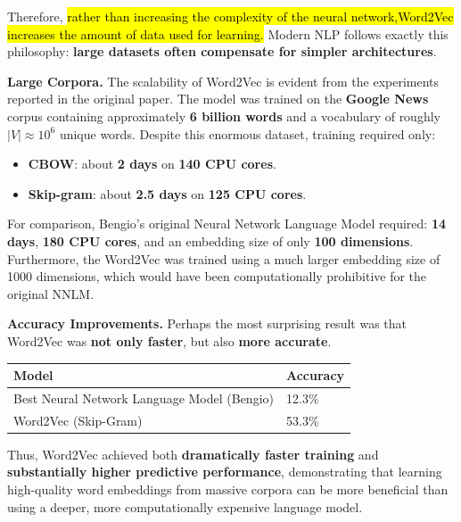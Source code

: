 \highspace
Therefore, \hl{rather than increasing the complexity of the neural network,\break Word2Vec increases the amount of data used for learning.} Modern NLP follows exactly this philosophy: \textbf{large datasets often compensate for simpler architectures}.

\highspace
\textcolor{Green3}{ \textbf{Large Corpora.}} The scalability of Word2Vec is evident from the experiments reported in the original paper. The model was trained on the \textbf{Google News} corpus containing approximately \textbf{6 billion words} and a vocabulary of roughly $\left|V\right| \approx 10^{6}$ unique words. Despite this enormous dataset, training required only:
\begin{itemize}
    \item \textbf{CBOW}: about \textbf{2 days} on \textbf{140 CPU cores}.
    \item \textbf{Skip-gram}: about \textbf{2.5 days} on \textbf{125 CPU cores}.
\end{itemize}
For comparison, Bengio's original Neural Network Language Model required: \textbf{14 days}, \textbf{180 CPU cores}, and an embedding size of only \textbf{100 dimensions}. Furthermore, the Word2Vec was trained using a much larger embedding size of 1000 dimensions, which would have been computationally prohibitive for the original NNLM.

\highspace
\textcolor{Green3}{ \textbf{Accuracy Improvements.}} Perhaps the most surprising result was that Word2Vec was \textbf{not only faster}, but also \textbf{more accurate}.
\begin{center}
    \begin{tabular}{@{} l l @{}}
        \toprule
        \textbf{Model} & \textbf{Accuracy} \\
        \midrule
        Best Neural Network Language Model (Bengio) & 12.3\% \\
        Word2Vec (Skip-Gram) & 53.3\% \\
        \bottomrule
    \end{tabular}
\end{center}
\noindent
Thus, Word2Vec achieved both \textbf{dramatically faster training} and \textbf{substantially higher predictive performance}, demonstrating that learning high-quality word embeddings from massive corpora can be more beneficial than using a deeper, more computationally expensive language model.

